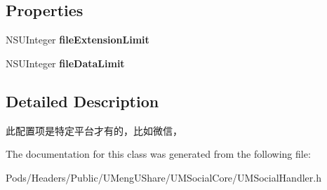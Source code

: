 \subsection*{Properties}
\begin{DoxyCompactItemize}
\item 
\mbox{\label{interface_u_m_social_share_file_object_config_aed7f62113b63c9b805b715fc3faa77b2}} 
N\+S\+U\+Integer {\bfseries file\+Extension\+Limit}
\item 
\mbox{\label{interface_u_m_social_share_file_object_config_ad8470da2ba166a8c0fc2d147982a1326}} 
N\+S\+U\+Integer {\bfseries file\+Data\+Limit}
\end{DoxyCompactItemize}


\subsection{Detailed Description}
此配置项是特定平台才有的，比如微信， 

The documentation for this class was generated from the following file\+:\begin{DoxyCompactItemize}
\item 
Pods/\+Headers/\+Public/\+U\+Meng\+U\+Share/\+U\+M\+Social\+Core/U\+M\+Social\+Handler.\+h\end{DoxyCompactItemize}

